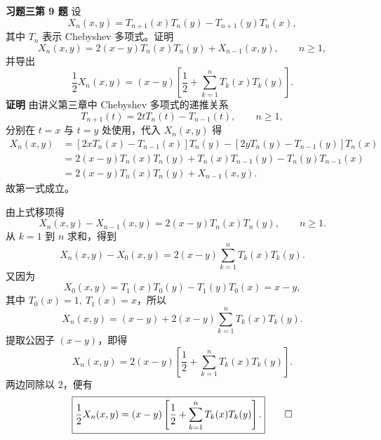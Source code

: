 \documentclass[UTF8,a4paper,11pt]{ctexart}
\newcommand*{\QED}{\hfill\ensuremath{\square}}
\begin{document}
\bigskip\bigskip

\noindent\textbf{习题三\quad 第 9 题}\quad
设
\[
  X_n(x,y)=T_{n+1}(x)T_n(y)-T_{n+1}(y)T_n(x),
\]
其中 $T_n$ 表示 Chebyshev 多项式。证明
\[
  X_n(x,y)=2(x-y)T_n(x)T_n(y)+X_{n-1}(x,y),\qquad n\ge 1,
\]
并导出
\[
  \frac{1}{2}X_n(x,y)=(x-y)\left[\frac{1}{2}+\sum_{k=1}^n T_k(x)T_k(y)\right].
\]
\medskip
\noindent\textbf{证明}\quad
由讲义第三章中 Chebyshev 多项式的递推关系
\[
  T_{n+1}(t)=2tT_n(t)-T_{n-1}(t),\qquad n\ge 1,
\]
分别在 $t=x$ 与 $t=y$ 处使用，代入 $X_n(x,y)$ 得
\begin{align*}
  X_n(x,y)
  &=[2xT_n(x)-T_{n-1}(x)]T_n(y)-[2yT_n(y)-T_{n-1}(y)]T_n(x) \\
  &=2(x-y)T_n(x)T_n(y)+T_n(x)T_{n-1}(y)-T_n(y)T_{n-1}(x) \\
  &=2(x-y)T_n(x)T_n(y)+X_{n-1}(x,y).
\end{align*}
故第一式成立。

\medskip
由上式移项得
\[
  X_n(x,y)-X_{n-1}(x,y)=2(x-y)T_n(x)T_n(y),\qquad n\ge 1.
\]
从 $k=1$ 到 $n$ 求和，得到
\[
  X_n(x,y)-X_0(x,y)=2(x-y)\sum_{k=1}^n T_k(x)T_k(y).
\]
又因为
\[
  X_0(x,y)=T_1(x)T_0(y)-T_1(y)T_0(x)=x-y,
\]
其中 $T_0(x)=1,\ T_1(x)=x$，所以
\[
  X_n(x,y)=(x-y)+2(x-y)\sum_{k=1}^n T_k(x)T_k(y).
\]
提取公因子 $(x-y)$，即得
\[
  X_n(x,y)=2(x-y)\left[\frac{1}{2}+\sum_{k=1}^n T_k(x)T_k(y)\right].
\]
两边同除以 $2$，便有
\[
  \boxed{
  \frac{1}{2}X_n(x,y)=(x-y)\left[\frac{1}{2}+\sum_{k=1}^n T_k(x)T_k(y)\right].}
  \qquad \QED
\]
\end{document}
